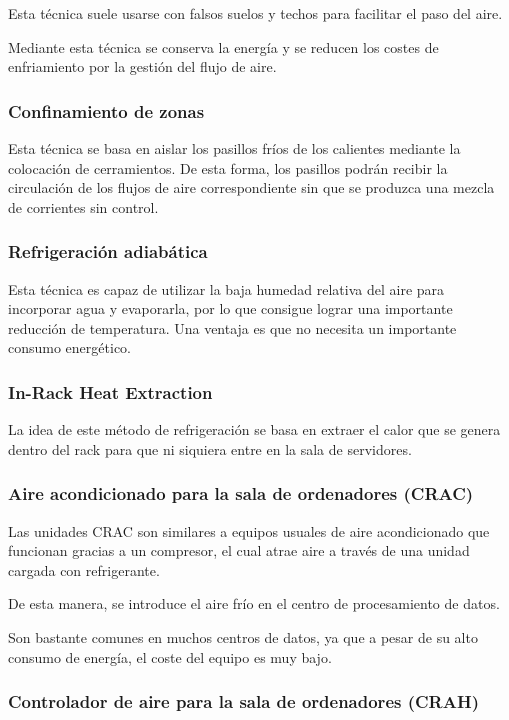 Esta técnica suele usarse con falsos suelos y techos para facilitar el paso del aire.

Mediante esta técnica se conserva la energía y se reducen los costes de enfriamiento por la gestión del flujo de aire.


\subsubsection*{Confinamiento de zonas}

Esta técnica se basa en aislar los pasillos fríos de los calientes mediante la colocación de cerramientos. De esta forma, los pasillos podrán recibir la circulación de los flujos de aire correspondiente sin que se produzca una mezcla de corrientes sin control.

\subsubsection*{Refrigeración adiabática}

Esta técnica es capaz de utilizar la baja humedad relativa del aire para incorporar agua y evaporarla, por lo que consigue lograr una importante reducción de temperatura. Una ventaja es que no necesita un importante consumo energético.

\subsubsection*{In-Rack Heat Extraction}

La idea de este método de refrigeración se basa en extraer el calor que se genera dentro del rack para que ni siquiera entre en la sala de servidores.

\subsubsection*{Aire acondicionado para la sala de ordenadores (CRAC)}

Las unidades CRAC son similares a equipos usuales de aire acondicionado que funcionan gracias a un compresor, el cual atrae aire a través de una unidad cargada con refrigerante.

De esta manera, se introduce el aire frío en el centro de procesamiento de datos.

Son bastante comunes en muchos centros de datos, ya que a pesar de su alto consumo de energía, el coste del equipo es muy bajo.

\subsubsection*{Controlador de aire para la sala de ordenadores (CRAH)}

